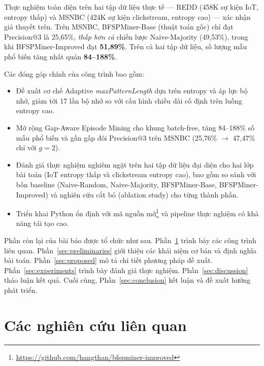 \documentclass{article}
\begin{document}
Thực nghiệm toàn diện trên hai tập dữ liệu thực tế --- REDD (458K sự kiện IoT, entropy thấp) và MSNBC (424K sự kiện clickstream, entropy cao) --- xác nhận giả thuyết trên. Trên MSNBC, BFSPMiner-Base (thuật toán gốc) chỉ đạt Precision@3 là 25,65\%, \textit{thấp hơn cả} chiến lược Naive-Majority (49,53\%), trong khi BFSPMiner-Improved đạt \textbf{51,89\%}. Trên cả hai tập dữ liệu, số lượng mẫu phổ biến tăng nhất quán \textbf{84--188\%}.

Các đóng góp chính của công trình bao gồm:
\begin{itemize}
    \item[(i)] Đề xuất cơ chế Adaptive \textit{maxPatternLength} dựa trên entropy và áp lực bộ nhớ, giảm tới 17 lần bộ nhớ so với cấu hình chiều dài cố định trên luồng entropy cao.
    \item[(ii)] Mở rộng Gap-Aware Episode Mining cho khung batch-free, tăng 84--188\% số mẫu phổ biến và gần gấp đôi Precision@3 trên MSNBC (25,76\% $\rightarrow$ 47,47\% chỉ với $g = 2$).
    \item[(iii)] Đánh giá thực nghiệm nghiêm ngặt trên hai tập dữ liệu đại diện cho hai lớp bài toán (IoT entropy thấp và clickstream entropy cao), bao gồm so sánh với bốn baseline (Naive-Random, Naive-Majority, BFSPMiner-Base, BFSPMiner-Improved) và nghiên cứu cắt bỏ (ablation study) cho từng thành phần.
    \item[(iv)] Triển khai Python ổn định với mã nguồn mở\footnote{\url{https://github.com/hangthan/bfspminer-improved}} và pipeline thực nghiệm có khả năng tái tạo cao.
\end{itemize}

Phần còn lại của bài báo được tổ chức như sau. Phần~\ref{sec:related} trình bày các công trình liên quan. Phần~\ref{sec:preliminaries} giới thiệu các khái niệm cơ bản và định nghĩa bài toán. Phần~\ref{sec:proposed} mô tả chi tiết phương pháp đề xuất. Phần~\ref{sec:experiments} trình bày đánh giá thực nghiệm. Phần~\ref{sec:discussion} thảo luận kết quả. Cuối cùng, Phần~\ref{sec:conclusion} kết luận và đề xuất hướng phát triển.

\section{Các nghiên cứu liên quan}
\label{sec:related}
\end{document}

